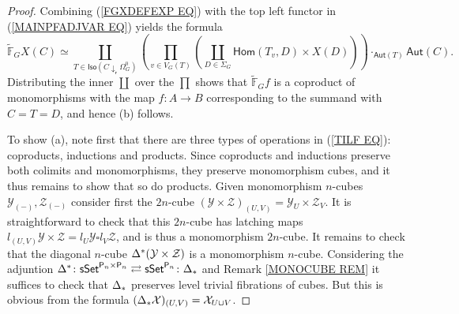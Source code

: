 \documentclass[a4paper,10pt]{article}%
\begin{document}
\begin{proof}
	Combining (\ref{FGXDEFEXP EQ}) with
	the top left functor in (\ref{MAINPFADJVAR EQ})
	yields the formula
\begin{equation}\label{TILF EQ}
\widetilde{\mathbb{F}}_G X (C) \simeq
\coprod_{T \in 
\mathsf{Iso}(C \downarrow_{\mathsf{r}} \Omega_G^0)}
\left(
\prod_{v \in V_G(T)}
\left(
	\coprod_{D\in \Sigma_G} \mathsf{Hom}(T_v,D) \times X(D)
\right)
\right) 
\cdot_{\mathsf{Aut}(T)} \mathsf{Aut}(C).
\end{equation}
	Distributing the inner $\coprod$ over the 
	$\prod$ %
	shows that 
	$\widetilde{\mathbb{F}}_G f$
	is a coproduct of monomorphisms with the map
	$f \colon A \to B$
	corresponding to the summand with $C=T=D$, and hence (b) follows.
	
	To show (a), note first that there are three types of operations in (\ref{TILF EQ}):
	coproducts, inductions and products.
	Since coproducts and inductions preserve both colimits and monomorphisms, they preserve monomorphism cubes,
	and it thus remains to show that so do products.
	Given monomorphism $n$-cubes
	$\mathcal{Y}_{(\minus)}, \mathcal{Z}_{(\minus)}$
	consider first the $2n$-cube 
	$(\mathcal{Y} \times \mathcal{Z})_{(U,V)} = \mathcal{Y}_U \times \mathcal{Z}_V$.
	It is straightforward to check that this $2n$-cube has latching maps
	$l_{(U,V)} \mathcal{Y} \times \mathcal{Z} =
	 l_U \mathcal{Y} \square l_V \mathcal{Z}$,
	and is thus a monomorphism $2n$-cube.
	It remains to check that
	the diagonal $n$-cube 
	$\Delta^{\**} (\mathcal{Y} \times \mathcal{Z})$
	is a monomorphism $n$-cube.
Considering the adjuntion
	$\Delta^{\**}\colon 
	\mathsf{sSet}^{\mathsf{P}_n \times \mathsf{P}_n}
		\rightleftarrows
	\mathsf{sSet}^{\mathsf{P}_n}
	\colon \Delta_{\**}
	$
and Remark \ref{MONOCUBE REM} it suffices to check that
$\Delta_{\**}$ preserves level trivial fibrations of cubes. But this is obvious from the formula
$(\Delta_{\**} \mathcal{X})_{(U,V)} = \mathcal{X}_{U \cup V}$.	
\end{proof}
\end{document}

